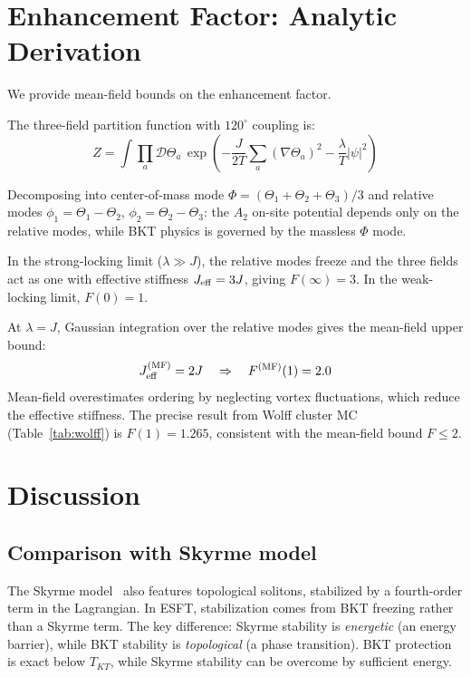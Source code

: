 ﻿\documentclass[twocolumn,showpacs,preprintnumbers,amsmath,amssymb,prd]{revtex4-2}
\begin{document}
\section{Enhancement Factor: Analytic Derivation}
\label{sec:derivation}

We provide mean-field bounds on the enhancement factor.

The three-field partition function with $120^\circ$ coupling is:
\begin{equation}
Z = \int \prod_a \mathcal{D}\Theta_a \, \exp\left(-\frac{J}{2T}\sum_a (\nabla\Theta_a)^2 - \frac{\lambda}{T}|\psi|^2\right)
\end{equation}

Decomposing into center-of-mass mode $\Phi = (\Theta_1 + \Theta_2 + \Theta_3)/3$ and relative modes $\phi_1 = \Theta_1 - \Theta_2$, $\phi_2 = \Theta_2 - \Theta_3$: the $A_2$ on-site potential depends only on the relative modes, while BKT physics is governed by the massless $\Phi$ mode.

In the strong-locking limit ($\lambda \gg J$), the relative modes freeze and the three fields act as one with effective stiffness $J_{\rm eff} = 3J$, giving $F(\infty) = 3$. In the weak-locking limit, $F(0) = 1$.

At $\lambda = J$, Gaussian integration over the relative modes gives the mean-field upper bound:
\begin{equation}
J_{\rm eff}^{(\rm MF)} = 2J \quad \Rightarrow \quad F^{(\rm MF)}(1) = 2.0
\label{eq:F_MF}
\end{equation}
Mean-field overestimates ordering by neglecting vortex fluctuations, which reduce the effective stiffness. The precise result from Wolff cluster MC (Table~\ref{tab:wolff}) is $F(1) = 1.265$, consistent with the mean-field bound $F \leq 2$.

\section{Discussion}

\subsection{Comparison with Skyrme model}

The Skyrme model~\cite{Skyrme1961} also features topological solitons, stabilized by a fourth-order term in the Lagrangian. In ESFT, stabilization comes from BKT freezing rather than a Skyrme term. The key difference: Skyrme stability is \emph{energetic} (an energy barrier), while BKT stability is \emph{topological} (a phase transition). BKT protection is exact below $T_{KT}$, while Skyrme stability can be overcome by sufficient energy.
\end{document}
